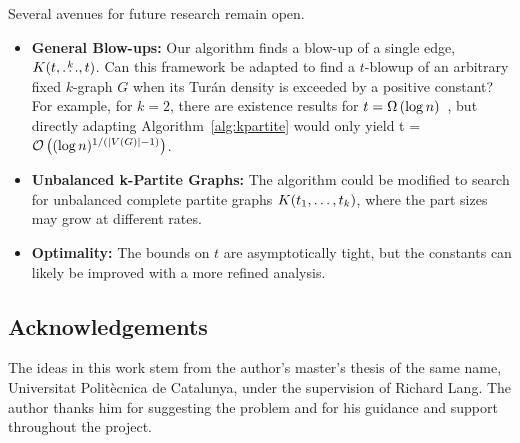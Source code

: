 Several avenues for future research remain open.
\begin{itemize}
    \item \textbf{General Blow-ups:} Our algorithm finds a blow-up of a single edge, $K(t, \overset{k}{\dots}, t)$.
    Can this framework be adapted to find a $t$-blowup of an arbitrary fixed $k$-graph $G$ when its Tur\'{a}n density is exceeded by a positive constant?
    For example, for $k=2$, there are existence results for $t = \Omega\left(\log n\right)$~\cite{bollobas1973structure}, but directly adapting Algorithm~\ref{alg:kpartite} would only
    yield t = $\mathcal{O}\left((\log n)^{1/(|V(G)| - 1)}\right)$.
    \item \textbf{Unbalanced k-Partite Graphs:} The algorithm could be modified to search for unbalanced complete partite graphs $K(t_1, \dots, t_k)$, where the part sizes may grow at different rates.
    \item \textbf{Optimality:} The bounds on $t$ are asymptotically tight, but the constants can likely be improved with a more refined analysis.
\end{itemize}

\subsection*{Acknowledgements}

The ideas in this work stem from the author's master's thesis of the same name,
Universitat Polit\`{e}cnica de Catalunya,
under the supervision of Richard Lang.
The author thanks him for suggesting the problem and for his guidance and support throughout the project.
